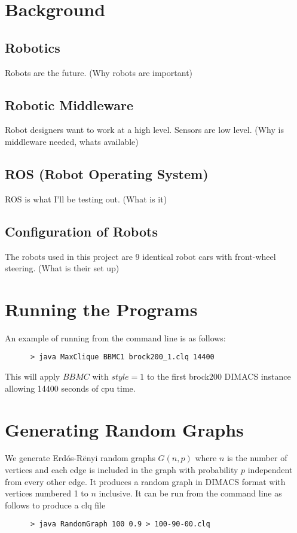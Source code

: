 \documentclass{l4proj}
\begin{document}
\chapter{Background}

\section{Robotics}

Robots are the future. (Why robots are important)

\section{Robotic Middleware}

Robot designers want to work at a high level. Sensors are low level. (Why is middleware needed, whats available)

\section{ROS (Robot Operating System)}

ROS is what I'll be testing out. (What is it)

\section{Configuration of Robots}

The robots used in this project are 9 identical robot cars with front-wheel steering. (What is their set up)



\chapter{Running the Programs}
An example of running from the command line is as follows:
\begin{verbatim}
      > java MaxClique BBMC1 brock200_1.clq 14400
\end{verbatim}
This will apply $BBMC$ with $style = 1$ to the first brock200 DIMACS instance allowing 14400 seconds of cpu time.

\chapter{Generating Random Graphs}
\label{sec:randomGraph}
We generate Erd\'{o}s-R\"{e}nyi random graphs $G(n,p)$ where $n$ is the number of vertices and
each edge is included in the graph with probability $p$ independent from every other edge. It produces
a random graph in DIMACS format with vertices numbered 1 to $n$ inclusive. It can be run from the command line as follows to produce 
a clq file
\begin{verbatim}
      > java RandomGraph 100 0.9 > 100-90-00.clq
\end{verbatim}




\end{document}
